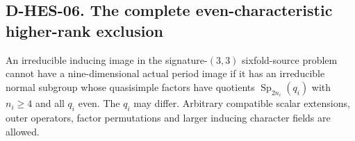 \subsection*{D-HES-06. The complete even-characteristic higher-rank exclusion}

\begin{theorem}[D-HES-06]
An irreducible inducing image in the signature-$(3,3)$ sixfold-source
problem cannot have a nine-dimensional actual period image if it has
an irreducible normal subgroup whose quasisimple factors have quotients
$\operatorname{Sp}_{2n_i}(q_i)$ with $n_i\ge4$ and all $q_i$ even.
The $q_i$ may differ. Arbitrary compatible scalar extensions, outer
operators, factor permutations and larger inducing character fields
are allowed.
\end{theorem}


